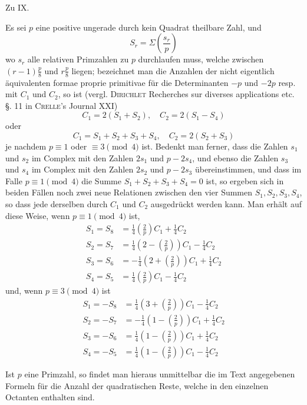 \begin{center}\large Zu IX.\end{center}

Es sei $p$ eine positive ungerade durch kein Quadrat theilbare Zahl, und
\[
S_r=\Sigma\left(\frac{s_r}p\right)
\]
wo $s_r$ alle relativen Primzahlen zu $p$ durchlaufen muss, welche zwischen $(r-1)\frac p8$ und $r\frac p8$ liegen; bezeichnet man die Anzahlen der nicht eigentlich äquivalenten formae proprie primitivae für die Determinanten $-p$ und $-2p$ resp. mit $C_1$ und $C_2$, so ist (vergl. \textsc{Dirichlet} Recherches sur diverses applications etc. §. 11 in \textsc{Crelle}'s Journal XXI)
\[
C_1=2(S_1+S_2),\quad C_2=2(S_1-S_4)
\]
oder
\[
C_1=S_1+S_2+S_3+S_4,\quad C_2=2(S_2+S_3)
\]
je nachdem $p\equiv1$ oder $\equiv3\pmod4$ ist. Bedenkt man ferner, dass die Zahlen $s_1$ und $s_2$ im Complex mit den Zahlen $2s_1$ und $p-2s_4$, und ebenso die Zahlen $s_3$ und $s_4$ im Complex mit den Zahlen $2s_2$ und $p-2s_3$ übereinstimmen, und dass im Falle $p\equiv1\pmod4$ die Summe $S_1+S_2+S_3+S_4=0$ ist, so ergeben sich in beiden Fällen noch zwei neue Relationen zwischen den vier Summen $S_1,S_2,S_3,S_4$, so dass jede derselben durch $C_1$ und $C_2$ ausgedrückt werden kann. Man erhält auf diese Weise, wenn $p\equiv1\pmod4$ ist,
\[
\begin{aligned}
S_1=S_8&=\tfrac14\left(\frac2p\right)C_1+\tfrac14C_2\\
S_2=S_7&=\tfrac14\left(2-\left(\frac2p\right)\right)C_1-\tfrac14C_2\\
S_3=S_6&=-\tfrac14\left(2+\left(\frac2p\right)\right)C_1+\tfrac14C_2\\
S_4=S_5&=\tfrac14\left(\frac2p\right)C_1-\tfrac14C_2
\end{aligned}
\]
und, wenn $p\equiv3\pmod4$ ist
\[
\begin{aligned}
S_1=-S_8&=\tfrac14\left(3+\left(\frac2p\right)\right)C_1-\tfrac14C_2\\
S_2=-S_7&=-\tfrac14\left(1-\left(\frac2p\right)\right)C_1+\tfrac14C_2\\
S_3=-S_6&=\tfrac14\left(1-\left(\frac2p\right)\right)C_1+\tfrac14C_2\\
S_4=-S_5&=\tfrac14\left(1-\left(\frac2p\right)\right)C_1-\tfrac14C_2
\end{aligned}
\]

Ist $p$ eine Primzahl, so findet man hieraus unmittelbar die im Text angegebenen Formeln für die Anzahl der quadratischen Reste, welche in den einzelnen Octanten enthalten sind.
\BookRule{35mm}
